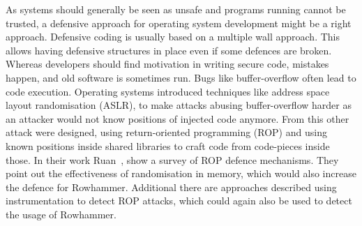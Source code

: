 As systems should generally be seen as unsafe and programs running cannot be
trusted, a defensive approach for operating system development might be a right
approach. Defensive coding is usually based on a multiple wall approach. This
allows having defensive structures in place even if some defences are broken.
Whereas developers should find motivation in writing secure code, mistakes
happen, and old software is sometimes run. Bugs like buffer-overflow often lead
to code execution. Operating systems introduced techniques like address space
layout randomisation (ASLR), to make attacks abusing buffer-overflow harder as
an attacker would not know positions of injected code anymore. From this other
attack were designed, using return-oriented programming (ROP) and using known
positions inside shared libraries to craft code from code-pieces inside those.
In their work Ruan~\etal\cite{ropsur}, show a survey of ROP defence mechanisms.
They point out the effectiveness of randomisation in memory, which would also
increase the defence for Rowhammer. Additional there are approaches described
using instrumentation to detect ROP attacks, which could again also be used to
detect the usage of Rowhammer.

